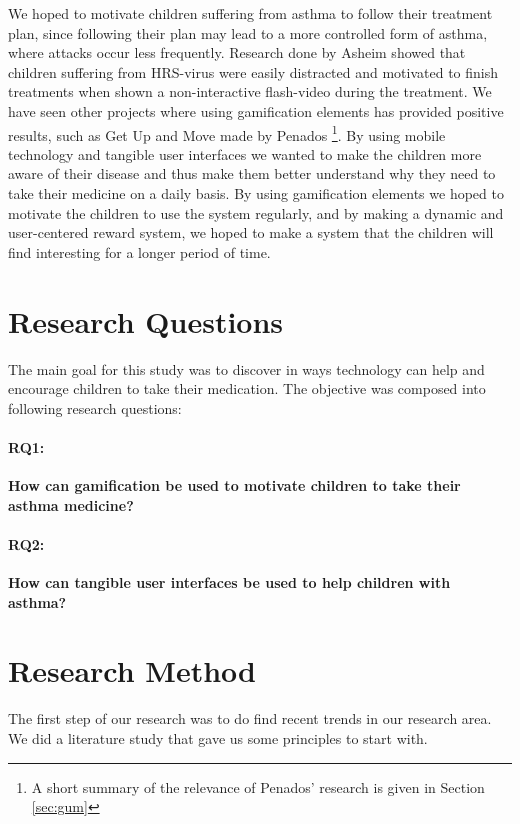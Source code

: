 We hoped to motivate children suffering from asthma to follow their treatment plan, since following their plan may lead to a more controlled form of asthma, where attacks occur less frequently\cite{ginasthma}. 
Research done by Asheim showed that children suffering from HRS-virus were easily distracted and motivated to finish treatments when shown a non-interactive flash-video during the treatment\cite{asheim2012konsept}. We have seen other projects where using gamification elements has provided positive results, such as Get Up and Move made by Penados \etal{}\cite{penadosget}\footnote{A short summary of the relevance of Penados' research is given in Section \ref{sec:gum}}. 
By using mobile technology and tangible user interfaces we wanted to make the children more aware of their disease and thus make them better understand why they need to take their medicine on a daily basis. 
By using gamification elements we hoped to motivate the children to use the system regularly, and by making a dynamic and user-centered reward system, we hoped to make a system that the children will find interesting for a longer period of time.  



\section{Research Questions}
\label{sec:researchquestions}
The main goal for this study was to discover in ways technology can help and encourage children to take their medication. The objective was composed into following research questions: 

\paragraph{RQ1:}
\textbf{How can gamification be used to motivate children to take their asthma medicine?}


\paragraph{RQ2:}
\textbf{How can tangible user interfaces be used to help children with asthma?}


\section{Research Method}
\label{sec:researchmethod}

The first step of our research was to do find recent trends in our research area. We did a literature study that gave us some principles to start with. 
 
